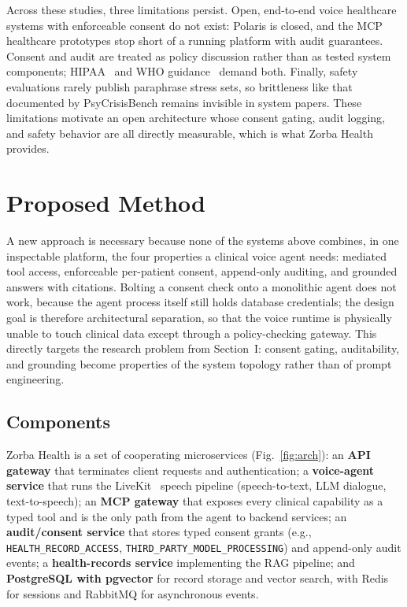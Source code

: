 \documentclass[conference]{IEEEtran}
\begin{document}
Across these studies, three limitations persist.
Open, end-to-end voice healthcare systems with enforceable consent do not exist: Polaris is closed, and the MCP healthcare prototypes stop short of a running platform with audit guarantees.
Consent and audit are treated as policy discussion rather than as tested system components; HIPAA~\cite{hipaa1996} and WHO guidance~\cite{who2024lmm} demand both.
Finally, safety evaluations rarely publish paraphrase stress sets, so brittleness like that documented by PsyCrisisBench remains invisible in system papers.
These limitations motivate an open architecture whose consent gating, audit logging, and safety behavior are all directly measurable, which is what Zorba Health provides.

\section{Proposed Method}
A new approach is necessary because none of the systems above combines, in one inspectable platform, the four properties a clinical voice agent needs: mediated tool access, enforceable per-patient consent, append-only auditing, and grounded answers with citations.
Bolting a consent check onto a monolithic agent does not work, because the agent process itself still holds database credentials; the design goal is therefore architectural separation, so that the voice runtime is physically unable to touch clinical data except through a policy-checking gateway.
This directly targets the research problem from Section~I: consent gating, auditability, and grounding become properties of the system topology rather than of prompt engineering.

\subsection{Components}
Zorba Health is a set of cooperating microservices (Fig.~\ref{fig:arch}):
an \textbf{API gateway} that terminates client requests and authentication;
a \textbf{voice-agent service} that runs the LiveKit~\cite{livekitagents} speech pipeline (speech-to-text, LLM dialogue, text-to-speech);
an \textbf{MCP gateway} that exposes every clinical capability as a typed tool and is the only path from the agent to backend services;
an \textbf{audit/consent service} that stores typed consent grants (e.g., \texttt{HEALTH\_RECORD\_ACCESS}, \texttt{THIRD\_PARTY\_MODEL\_PROCESSING}) and append-only audit events;
a \textbf{health-records service} implementing the RAG pipeline;
and \textbf{PostgreSQL with pgvector} for record storage and vector search, with Redis for sessions and RabbitMQ for asynchronous events.
\end{document}
